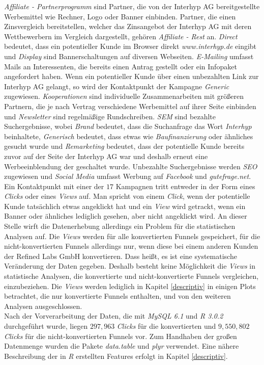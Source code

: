 \noindent \textit{Affiliate - Partnerprogramm} sind Partner, die von der Interhyp AG bereitgestellte Werbemittel wie Rechner, Logo oder Banner einbinden. Partner, die einen Zinsvergleich bereitstellen, welcher das Zinsangebot der Interhyp AG mit deren Wettbewerbern im Vergleich dargestellt, gehören \textit{Affiliate - Rest} an. \textit{Direct} bedeutet, dass ein potentieller Kunde im Browser direkt \textit{www.interhyp.de} eingibt und \textit{Display} sind Bannerschaltungen auf diversen Webseiten. \textit{E-Mailing} umfasst Mails an Interessenten, die bereits einen Antrag gestellt oder ein Infopaket angefordert haben. Wenn ein potentieller Kunde über einen unbezahlten Link zur Interhyp AG gelangt, so wird der Kontaktpunkt der Kampagne \textit{Generic} zugewiesen. \textit{Kooperationen} sind individuelle Zusammenarbeiten mit größeren Partnern, die je nach Vertrag verschiedene Werbemittel auf ihrer Seite einbinden und \textit{Newsletter} sind regelmäßige Rundschreiben. \textit{SEM} sind bezahlte Suchergebnisse, wobei \textit{Brand} bedeutet, dass die Suchanfrage das Wort \textit{Interhyp} beinhaltete, \textit{Generisch} bedeutet, dass etwas wie \textit{Baufinanzierung} oder ähnliches gesucht wurde und \textit{Remarketing} bedeutet, dass der potentielle Kunde bereits zuvor auf der Seite der Interhyp AG war und deshalb erneut eine Werbeeinblendung der geschaltet wurde. Unbezahlte Suchergebnisse werden \textit{SEO} zugewiesen und \textit{Social Media} umfasst Werbung auf \textit{Facebook} und \textit{gutefrage.net}.\\
Ein Kontaktpunkt mit einer der $17$ Kampagnen tritt entweder in der Form eines \textit{Clicks} oder eines \textit{Views} auf. Man spricht von einem \textit{Click}, wenn der potentielle Kunde tatsächlich etwas angeklickt hat und ein \textit{View} wird getrackt, wenn ein Banner oder ähnliches lediglich gesehen, aber nicht angeklickt wird. An dieser Stelle wirft die Datenerhebung allerdings ein Problem für die statistischen Analysen auf. Die \textit{Views} werden für alle konvertierten Funnels gespeichert, für die nicht-konvertierten Funnels allerdings nur, wenn diese bei einem anderen Kunden der Refined Labs GmbH konvertieren. Dass heißt, es ist eine systematische Veränderung der Daten gegeben. Deshalb besteht keine Möglichkeit die \textit{Views} in statistische Analysen, die konvertierte und nicht-konvertierte Funnels vergleichen, einzubeziehen. Die \textit{Views} werden lediglich in Kapitel \ref{descriptiv} in einigen Plots betrachtet, die nur konvertierte Funnels enthalten, und von den weiteren Analysen ausgeschlossen.\\
Nach der Vorverarbeitung der Daten, die mit \textit{MySQL 6.1} und \textit{R 3.0.2} \cite{r} durchgeführt wurde, liegen $ 297,963 $ \textit{Clicks} für die konvertierten und $ 9,550,802 $ \textit{Clicks} für die nicht-konvertierten Funnels vor. Zum Handhaben der großen Datenmenge wurden die Pakete \textit{data.table} \cite{data.table} und \textit{plyr} \cite{plyr} verwendet. Eine nähere Beschreibung der in \textit{R} erstellten Features erfolgt in Kapitel \ref{descriptiv}.\\



